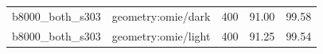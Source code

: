 \begin{longtable}{l>{\raggedright\arraybackslash}p{.42\linewidth}rrr}
b8000\_\allowbreak{}both\_\allowbreak{}s303 & %
geometry:omie/dark & %
400 & %
91.00 & %
99.58 \\ %

b8000\_\allowbreak{}both\_\allowbreak{}s303 & %
geometry:omie/light & %
400 & %
91.25 & %
99.54 \\ %


\end{longtable}
